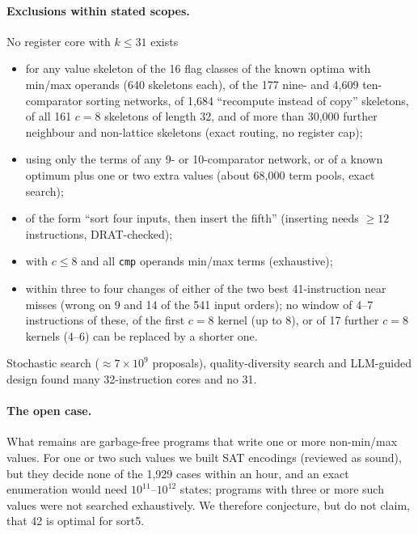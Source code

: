 \documentclass[11pt]{article}
\theoremstyle{remark}\newtheorem{remark}[theorem]{Remark}
\begin{document}
\paragraph{Exclusions within stated scopes.} No register core with $k \le 31$ exists
\begin{itemize}
\item for any value skeleton of the 16 flag classes of the known optima with min/max operands (640 skeletons each), of the
177 nine- and 4{,}609 ten-comparator sorting networks, of 1{,}684 ``recompute instead of copy'' skeletons, of all 161 $c = 8$
skeletons of length 32, and of more than 30{,}000 further neighbour and non-lattice skeletons (exact routing, no register cap);
\item using only the terms of any 9- or 10-comparator network, or of a known optimum plus one or two extra values
(about 68{,}000 term pools, exact search);
\item of the form ``sort four inputs, then insert the fifth'' (inserting needs $\ge 12$ instructions, DRAT-checked);
\item with $c \le 8$ and all \texttt{cmp} operands min/max terms (exhaustive);
\item within three to four changes of either of the two best 41-instruction near misses (wrong on 9 and 14 of the 541 input
orders); no window of 4--7 instructions of these, of the first $c = 8$ kernel (up to 8), or of 17 further $c = 8$ kernels (4--6)
can be replaced by a shorter one.
\end{itemize}
Stochastic search ($\approx 7\times10^9$ proposals), quality-diversity search and LLM-guided design found many 32-instruction
cores and no 31.

\paragraph{The open case.} What remains are garbage-free programs that write one or more non-min/max values. For one or two
such values we built SAT encodings (reviewed as sound), but they decide none of the 1{,}929 cases within an hour, and an exact
enumeration would need $10^{11}$--$10^{12}$ states; programs with three or more such values were not searched exhaustively.
We therefore conjecture, but do not claim, that 42 is optimal for sort5.


\end{document}
